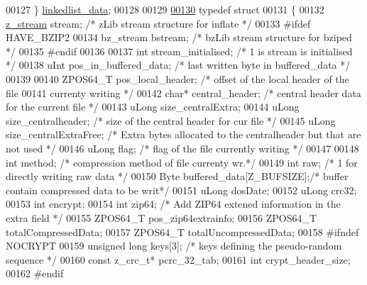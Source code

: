 \begin{DoxyCode}
00127 \} \hyperlink{structlinkedlist__data__s}{linkedlist\_data};
00128 
00129 
\hyperlink{structcurfile64__info}{00130} \textcolor{keyword}{typedef} \textcolor{keyword}{struct}
00131 \{
00132     \hyperlink{structz__stream__s}{z\_stream} stream;            \textcolor{comment}{/* zLib stream structure for inflate */}
00133 \textcolor{preprocessor}{#ifdef HAVE\_BZIP2}
00134     bz\_stream bstream;          \textcolor{comment}{/* bzLib stream structure for bziped */}
00135 \textcolor{preprocessor}{#endif}
00136 
00137     \textcolor{keywordtype}{int}  stream\_initialised;    \textcolor{comment}{/* 1 is stream is initialised */}
00138     uInt pos\_in\_buffered\_data;  \textcolor{comment}{/* last written byte in buffered\_data */}
00139 
00140     ZPOS64\_T pos\_local\_header;     \textcolor{comment}{/* offset of the local header of the file}
00141 \textcolor{comment}{                                     currenty writing */}
00142     \textcolor{keywordtype}{char}* central\_header;       \textcolor{comment}{/* central header data for the current file */}
00143     uLong size\_centralExtra;
00144     uLong size\_centralheader;   \textcolor{comment}{/* size of the central header for cur file */}
00145     uLong size\_centralExtraFree; \textcolor{comment}{/* Extra bytes allocated to the centralheader but that are not used */}
00146     uLong flag;                 \textcolor{comment}{/* flag of the file currently writing */}
00147 
00148     \textcolor{keywordtype}{int}  method;                \textcolor{comment}{/* compression method of file currenty wr.*/}
00149     \textcolor{keywordtype}{int}  raw;                   \textcolor{comment}{/* 1 for directly writing raw data */}
00150     Byte buffered\_data[Z\_BUFSIZE];\textcolor{comment}{/* buffer contain compressed data to be writ*/}
00151     uLong dosDate;
00152     uLong crc32;
00153     \textcolor{keywordtype}{int}  encrypt;
00154     \textcolor{keywordtype}{int}  zip64;               \textcolor{comment}{/* Add ZIP64 extened information in the extra field */}
00155     ZPOS64\_T pos\_zip64extrainfo;
00156     ZPOS64\_T totalCompressedData;
00157     ZPOS64\_T totalUncompressedData;
00158 \textcolor{preprocessor}{#ifndef NOCRYPT}
00159     \textcolor{keywordtype}{unsigned} \textcolor{keywordtype}{long} keys[3];     \textcolor{comment}{/* keys defining the pseudo-random sequence */}
00160     \textcolor{keyword}{const} z\_crc\_t* pcrc\_32\_tab;
00161     \textcolor{keywordtype}{int} crypt\_header\_size;
00162 \textcolor{preprocessor}{#endif}

\end{DoxyCode}
